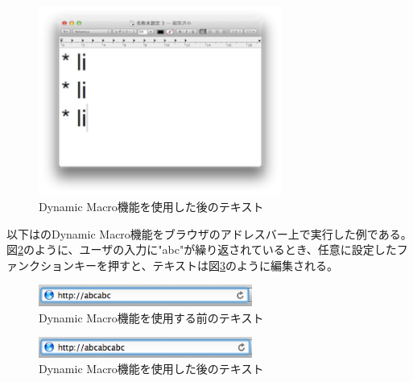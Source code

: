 \begin{figure}[H]
\centerline{\includegraphics[width=80mm,bb=0 0 360 220]{figures/dynamic2.png}}
\caption{Dynamic Macro機能を使用した後のテキスト}
\label{dynamic2}
\end{figure}


以下は{\system}のDynamic Macro機能をブラウザのアドレスバー上で実行した例である。
図\ref{dynamic3}のように、ユーザの入力に"abc"が繰り返されているとき、任意に設定したファンクションキーを押すと、テキストは図\ref{dynamic4}のように編集される。

\begin{figure}[H]
\centerline{\includegraphics[width=70mm,bb=0 0 360 50]{figures/dynamic3.png}}
\caption{Dynamic Macro機能を使用する前のテキスト}
\label{dynamic3}
\end{figure}

\begin{figure}[H]
\centerline{\includegraphics[width=70mm,bb=0 0 360 50]{figures/dynamic4.png}}
\caption{Dynamic Macro機能を使用した後のテキスト}
\label{dynamic4}
\end{figure}



